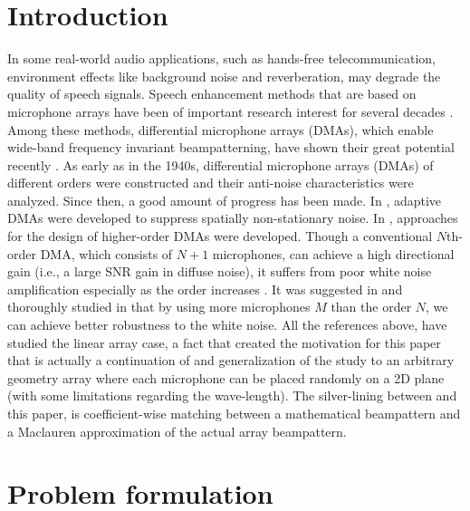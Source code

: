 \documentclass{article}
\begin{document}
\section{Introduction}
\label{sec:intro}
In some real-world audio applications, such as hands-free telecommunication, environment effects like background noise and reverberation, may degrade the quality of speech signals.
Speech enhancement methods that are based on microphone arrays have been of important research interest for several decades \cite{sps1,sps3,sps4}. 
Among these methods, differential microphone arrays (DMAs), which enable wide-band frequency invariant beampatterning, have shown their great potential recently  \cite{sps6,sps7}. 
As early as in the 1940s, differential microphone arrays (DMAs) of different orders were constructed and their anti-noise characteristics were analyzed. Since then, a good amount of progress has been made. 
In \cite{sps10,sps11}, adaptive DMAs were developed to suppress spatially non-stationary noise. 
In \cite{sps14,sps15}, approaches for the design of higher-order DMAs were developed.
Though a conventional $ N $th-order DMA, which consists of $ N+1 $ microphones, can achieve a high directional gain (i.e., a large SNR gain in diffuse noise), it suffers from poor white noise amplification especially as the order increases \cite{sps6}.
It was suggested in \cite{sps6} and thoroughly studied in \cite{sps17}  
that by using more microphones $ M $ than the order $ N $, we can achieve better robustness to the white noise.
All the references above, have studied the linear array case, a fact that created the motivation for this paper that is actually a continuation of \cite{sps17} and generalization of the study to an arbitrary geometry array where each microphone can be placed randomly on a 2D plane (with some limitations regarding the wave-length). The silver-lining between  \cite{sps17} and this paper, is coefficient-wise matching between a mathematical beampattern and a Maclauren approximation of the actual array beampattern.

\section{Problem formulation}
\label{sec:Problem_formulation}
\end{document}
